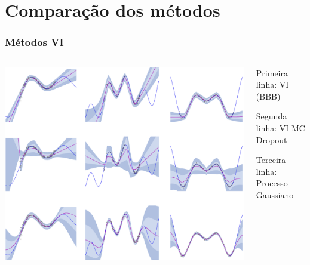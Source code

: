 \documentclass{beamer}
\begin{document}



\section{Comparação dos métodos}

\begin{frame}
    \frametitle{Métodos VI}

    \begin{columns}[c] %
        \begin{column}{0.75\textwidth}
            \includegraphics[width=\linewidth]{compare.png} %
        \end{column}
        \begin{column}{0.25\textwidth}
            Primeira linha: VI (BBB)
            \break

            Segunda linha: VI MC Dropout
            \break

            Terceira linha: Processo Gaussiano
        \end{column}
    \end{columns}

\end{frame}
\end{document}
